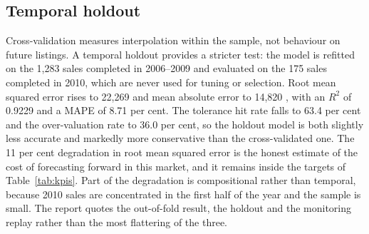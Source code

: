 \subsection{Temporal holdout}

Cross-validation measures interpolation within the sample, not behaviour on future
listings. A temporal holdout provides a stricter test: the model is refitted on the
1,283 sales completed in 2006--2009 and evaluated on the 175 sales completed in 2010,
which are never used for tuning or selection. Root mean squared error rises to 22,269
\USD{} and mean absolute error to 14,820 \USD, with an $R^2$ of 0.9229 and a MAPE of
8.71 per cent. The tolerance hit rate falls to 63.4 per cent and the over-valuation
rate to 36.0 per cent, so the holdout model is both slightly less accurate and
markedly more conservative than the cross-validated one. The 11 per cent degradation
in root mean squared error is the honest estimate of the cost of forecasting forward
in this market, and it remains inside the targets of Table~\ref{tab:kpis}. Part of
the degradation is compositional rather than temporal, because 2010 sales are
concentrated in the first half of the year and the sample is small. The report quotes
the out-of-fold result, the holdout and the monitoring replay rather than the most
flattering of the three.
